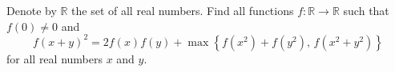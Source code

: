 Denote by $\mathbb{R}$ the set of all real numbers. Find all functions $f : \mathbb{R} \to \mathbb{R}$ such that $f(0) \neq 0$ and
\[ f(x+y)^2 = 2f(x)f(y) + \max\left\{ f(x^2) + f(y^2),\, f(x^2 + y^2) \right\} \]
for all real numbers $x$ and $y$.
